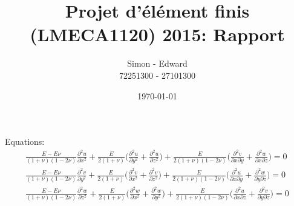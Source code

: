 \documentclass[12pt, a4paper]{report}
\author{Simon \bsc{Boigelot} - Edward \bsc{Nicol}\\72251300 - 27101300}
\title{Projet d'élément finis (LMECA1120) 2015: Rapport}
\date{\today}
\begin{document}
\maketitle
Equations:
\begin{eqnarray*}
\frac{E-E\nu}{(1+\nu)(1-2\nu)}\frac{\partial^2u}{\partial x^2} + \frac{E}{2(1+\nu)}\Bigg(\frac{\partial^2u}{\partial y^2} + \frac{\partial^2u}{\partial z^2}\Bigg) + \frac{E}{2(1+\nu)(1-2\nu)}\Bigg(\frac{\partial^2v}{\partial x \partial y} + \frac{\partial^2w}{\partial x \partial z}\Bigg) = 0\\
\frac{E-E\nu}{(1+\nu)(1-2\nu)}\frac{\partial^2v}{\partial y^2} + \frac{E}{2(1+\nu)}\Bigg(\frac{\partial^2v}{\partial x^2} + \frac{\partial^2v}{\partial z^2}\Bigg) + \frac{E}{2(1+\nu)(1-2\nu)}\Bigg(\frac{\partial^2u}{\partial x \partial y} + \frac{\partial^2w}{\partial y \partial z}\Bigg) = 0\\
\frac{E-E\nu}{(1+\nu)(1-2\nu)}\frac{\partial^2w}{\partial z^2} + \frac{E}{2(1+\nu)}\Bigg(\frac{\partial^2w}{\partial x^2} + \frac{\partial^2w}{\partial y^2}\Bigg) + \frac{E}{2(1+\nu)(1-2\nu)}\Bigg(\frac{\partial^2u}{\partial x \partial z} + \frac{\partial^2v}{\partial y \partial z}\Bigg) = 0
\end{eqnarray*}
\end{document}

